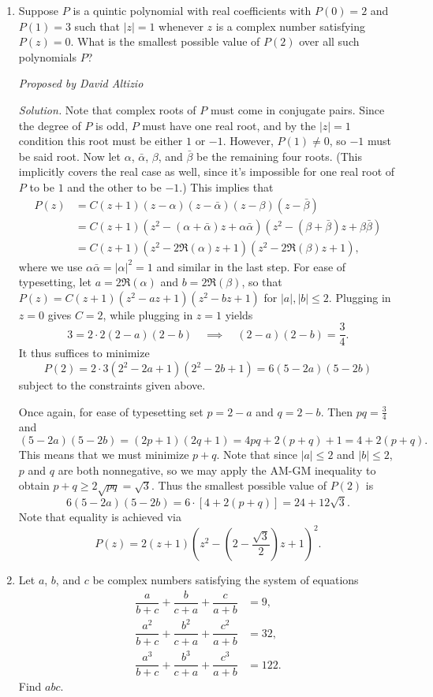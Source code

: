 \documentclass[10pt]{article}
\newcommand{\proposed}[1]
{
\vspace{5pt}
\noindent\textit{Proposed by #1}
}
\newcommand{\solution}
{
\vspace{5pt}
\noindent\textit{Solution.}\qquad
}
\begin{document}
\begin{enumerate}
\item Suppose $P$ is a quintic polynomial with real coefficients with $P(0)=2$ and $P(1)=3$ such that $|z|=1$ whenever $z$ is a complex number satisfying $P(z) = 0$.  What is the smallest possible value of $P(2)$ over all such polynomials $P$?

\proposed{David Altizio}

\solution Note that complex roots of $P$ must come in conjugate pairs.  Since the degree of $P$ is odd, $P$ must have one real root, and by the $|z|=1$ condition this root must be either $1$ or $-1$.  However, $P(1) \neq 0$, so $-1$ must be said root.  Now let $\alpha$, $\bar\alpha$, $\beta$, and $\bar\beta$ be the remaining four roots.  (This implicitly covers the real case as well, since it's impossible for one real root of $P$ to be $1$ and the other to be $-1$.)  This implies that \begin{align*}P(z) &= C(z+1)(z-\alpha)(z-\bar\alpha)(z-\beta)(z-\bar\beta)\\&= C(z+1)(z^2-(\alpha+\bar\alpha)z + \alpha\bar\alpha)(z^2-(\beta+\bar\beta)z + \beta\bar\beta)\\&=C(z+1)(z^2-2\Re(\alpha)z+1)(z^2-2\Re(\beta)z+1),\end{align*} where we use $\alpha\bar\alpha = |\alpha|^2 = 1$ and similar in the last step.  For ease of typesetting, let $a=2\Re(\alpha)$ and $b=2\Re(\beta)$, so that $P(z) = C(z+1)(z^2-az+1)(z^2-bz+1)$ for $|a|,|b|\leq 2$.  Plugging in $z=0$ gives $C=2$, while plugging in $z=1$ yields \[3 = 2\cdot 2(2-a)(2-b)\quad\implies\quad (2-a)(2-b)=\frac34.\] It thus suffices to minimize \[P(2) = 2\cdot 3(2^2-2a+1)(2^2-2b+1) = 6(5-2a)(5-2b)\] subject to the constraints given above.

\par Once again, for ease of typesetting set $p=2-a$ and $q=2-b$.  Then $pq=\tfrac34$ and \[(5-2a)(5-2b)=(2p+1)(2q+1) = 4pq+2(p+q)+1=4+2(p+q).\] This means that we must minimize $p+q$.  Note that since $|a|\leq 2$ and $|b|\leq 2$, $p$ and $q$ are both nonnegative, so we may apply the AM-GM inequality to obtain $p+q\geq 2\sqrt{pq} = \sqrt 3$.  Thus the smallest possible value of $P(2)$ is \[6(5-2a)(5-2b) = 6\cdot[4+2(p+q)] =\boxed{24+12\sqrt 3}.\] Note that equality is achieved via \[P(z) = 2(z+1)\left(z^2-\left(2-\frac{\sqrt 3}2\right)z+1\right)^2.\]

\item Let $a$, $b$, and $c$ be complex numbers satisfying the system of equations \begin{align*}\dfrac{a}{b+c}+\dfrac{b}{c+a}+\dfrac{c}{a+b}&=9,\\\dfrac{a^2}{b+c}+\dfrac{b^2}{c+a}+\dfrac{c^2}{a+b}&=32,\\\dfrac{a^3}{b+c}+\dfrac{b^3}{c+a}+\dfrac{c^3}{a+b}&=122.\end{align*} Find $abc$.


\end{enumerate}
\end{document}
